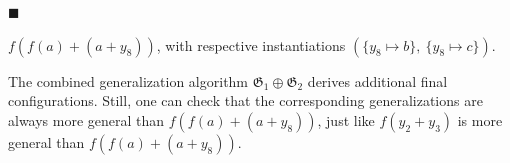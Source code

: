 \documentclass[10pt,a4paper]{amsart}
\begin{document}
 
 
\par\noindent  $\blacksquare$ 
 
$f(f(a)+(a+y_{8}))$, with respective instantiations $(\{y_{8}\mapsto b\},\ \{y_{8}\mapsto c\})$.\par
 
 
  
 
 
The combined generalization algorithm $\mathfrak{G}_{1}\oplus\mathfrak{G}_{2}$ derives additional final configurations. Still, one can check that the corresponding generalizations are always more general than $f(f(a)+(a+y_{8}))$, just like $f(y_{2}+y_{3})$ is more general than $f(f(a)+(a+y_{8}))$.\par
 
 
 
 
\end{document}
